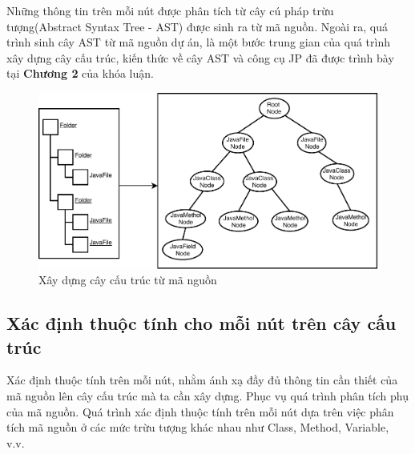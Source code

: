 \documentclass[12pt]{report}
\begin{document}
\noindent Những thông tin trên mỗi nút được phân tích từ cây cú pháp trừu tượng(Abstract Syntax Tree - AST) được sinh ra từ mã nguồn. Ngoài ra, quá trình sinh cây AST từ mã nguồn dự án, là một bước trung gian của quá trình xây dựng cây cấu trúc, kiến thức về cây AST và công cụ JP đã được trình bày tại \textbf{Chương 2} của khóa luận.
\begin{figure}[!htbp]
	\centering
	\vspace{0.5cm}
	\includegraphics[scale=0.32]{images/structure_tree}
	\caption{Xây dựng cây cấu trúc từ mã nguồn}
	\label{fig:universe}
\end{figure}
\subsection{Xác định thuộc tính cho mỗi nút trên cây cấu trúc}
Xác định thuộc tính trên mỗi nút, nhằm ánh xạ đầy đủ thông tin cần thiết của mã nguồn lên cây cấu trúc mà ta cần xây dựng. Phục vụ quá trình phân tích phụ của mã nguồn. Quá trình xác định thuộc tính trên mỗi nút dựa trên việc phân tích mã nguồn ở các mức trừu tượng khác nhau như Class, Method, Variable, v.v.
\end{document}
